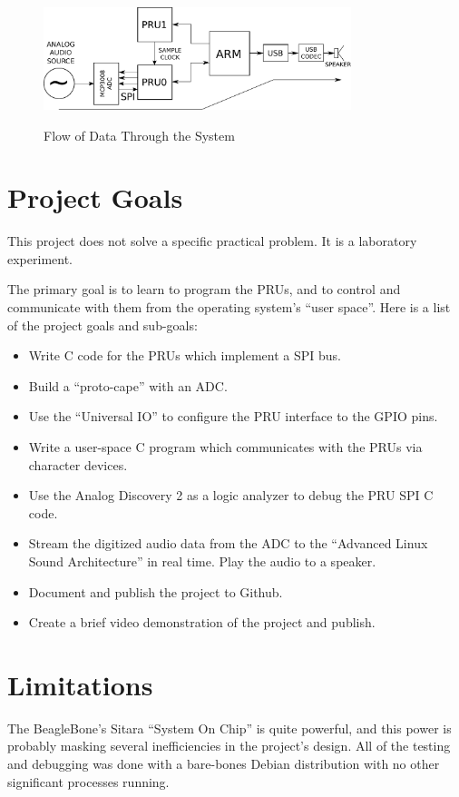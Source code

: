 \begin{figure}[H]
	\centering
	\includegraphics[width=0.8\textwidth]{diagrams/data_flow_intro}
	\centering\bfseries
	\caption{Flow of Data Through the System}
\end{figure}

\section{Project Goals}

This project does not solve a specific practical problem.  It is a laboratory experiment.

The primary goal is to learn to program the PRUs, and to control and communicate with them from the operating system's ``user space''.  Here is a list of the project goals and sub-goals:

\begin{itemize}
	\item Write C code for the PRUs which implement a SPI bus.
	\item Build a ``proto-cape'' with an ADC.
	\item Use the ``Universal IO'' to configure the PRU interface to the GPIO pins.
	\item Write a user-space C program which communicates with the PRUs via character devices.
	\item Use the Analog Discovery 2 as a logic analyzer to debug the PRU SPI C code.
	\item Stream the digitized audio data from the ADC to the ``Advanced Linux Sound Architecture'' in real time.  Play the audio to a speaker.
	\item Document and publish the project to Github.
	\item Create a brief video demonstration of the project and publish.
\end{itemize}

\section{Limitations}

The BeagleBone's Sitara ``System On Chip'' is quite powerful, and this power is probably masking several inefficiencies in the project's design.  All of the testing and debugging was done with a bare-bones Debian distribution with no other significant processes running.

